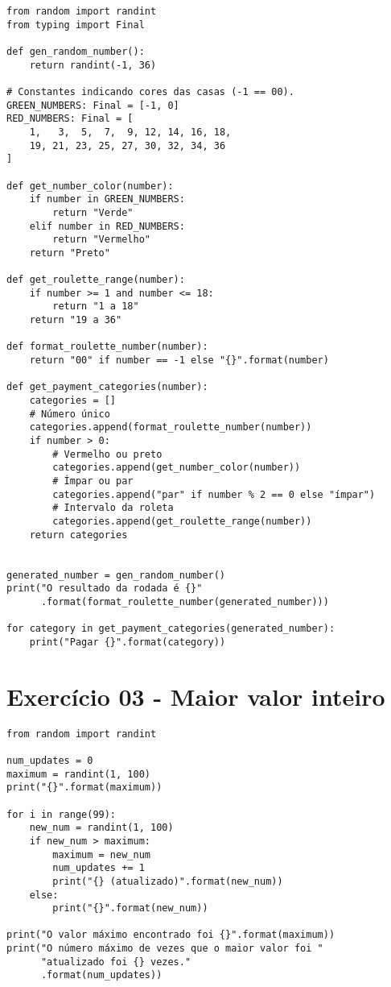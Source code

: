 \documentclass[article, a4paper, oneside, 11pt, english, brazil, sumario=tradicional]{abntex2}
\begin{document}
\begin{verbatim}
from random import randint
from typing import Final

def gen_random_number():
    return randint(-1, 36)

# Constantes indicando cores das casas (-1 == 00).
GREEN_NUMBERS: Final = [-1, 0]
RED_NUMBERS: Final = [
    1,   3,  5,  7,  9, 12, 14, 16, 18,
    19, 21, 23, 25, 27, 30, 32, 34, 36
]

def get_number_color(number):
    if number in GREEN_NUMBERS:
        return "Verde"
    elif number in RED_NUMBERS:
        return "Vermelho"
    return "Preto"

def get_roulette_range(number):
    if number >= 1 and number <= 18:
        return "1 a 18"
    return "19 a 36"

def format_roulette_number(number):
    return "00" if number == -1 else "{}".format(number)

def get_payment_categories(number):
    categories = []
    # Número único
    categories.append(format_roulette_number(number))
    if number > 0:
        # Vermelho ou preto
        categories.append(get_number_color(number))
        # Ímpar ou par
        categories.append("par" if number % 2 == 0 else "ímpar")
        # Intervalo da roleta
        categories.append(get_roulette_range(number))
    return categories


generated_number = gen_random_number()
print("O resultado da rodada é {}"
      .format(format_roulette_number(generated_number)))

for category in get_payment_categories(generated_number):
    print("Pagar {}".format(category))
\end{verbatim}

\newpage
\section{Exercício 03 - Maior valor inteiro}
\label{sec:org818aa92}

\begin{verbatim}
from random import randint

num_updates = 0
maximum = randint(1, 100)
print("{}".format(maximum))

for i in range(99):
    new_num = randint(1, 100)
    if new_num > maximum:
        maximum = new_num
        num_updates += 1
        print("{} (atualizado)".format(new_num))
    else:
        print("{}".format(new_num))

print("O valor máximo encontrado foi {}".format(maximum))
print("O número máximo de vezes que o maior valor foi "
      "atualizado foi {} vezes."
      .format(num_updates))
\end{verbatim}
\end{document}

